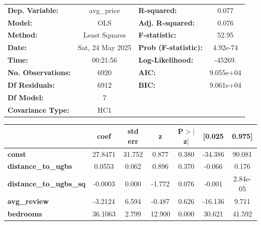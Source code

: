 \begin{center}
\begin{tabular}{lclc}
\toprule
\textbf{Dep. Variable:}         &    avg\_price    & \textbf{  R-squared:         } &       0.077    \\
\textbf{Model:}                 &       OLS        & \textbf{  Adj. R-squared:    } &       0.076    \\
\textbf{Method:}                &  Least Squares   & \textbf{  F-statistic:       } &       52.95    \\
\textbf{Date:}                  & Sat, 24 May 2025 & \textbf{  Prob (F-statistic):} &    4.92e-74    \\
\textbf{Time:}                  &     00:21:56     & \textbf{  Log-Likelihood:    } &     -45269.    \\
\textbf{No. Observations:}      &        6920      & \textbf{  AIC:               } &   9.055e+04    \\
\textbf{Df Residuals:}          &        6912      & \textbf{  BIC:               } &   9.061e+04    \\
\textbf{Df Model:}              &           7      & \textbf{                     } &                \\
\textbf{Covariance Type:}       &       HC1        & \textbf{                     } &                \\
\bottomrule
\end{tabular}
\begin{tabular}{lcccccc}
                                & \textbf{coef} & \textbf{std err} & \textbf{z} & \textbf{P$> |$z$|$} & \textbf{[0.025} & \textbf{0.975]}  \\
\midrule
\textbf{const}                  &      27.8471  &       31.752     &     0.877  &         0.380        &      -34.386    &       90.081     \\
\textbf{distance\_to\_ugbs}     &       0.0553  &        0.062     &     0.896  &         0.370        &       -0.066    &        0.176     \\
\textbf{distance\_to\_ugbs\_sq} &      -0.0003  &        0.000     &    -1.772  &         0.076        &       -0.001    &     2.84e-05     \\
\textbf{avg\_review}            &      -3.2124  &        6.594     &    -0.487  &         0.626        &      -16.136    &        9.711     \\
\textbf{bedrooms}               &      36.1063  &        2.799     &    12.900  &         0.000        &       30.621    &       41.592     \\

\end{tabular}
\end{center}
